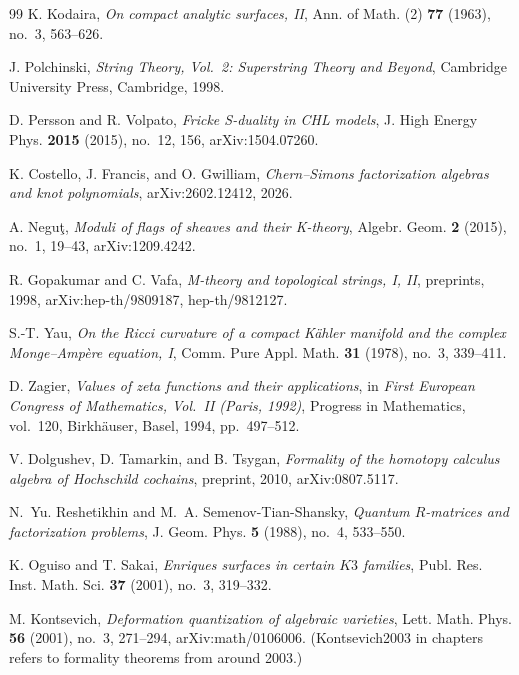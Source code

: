 \begin{thebibliography}{99}
K. Kodaira, \emph{On compact analytic surfaces, II}, Ann. of Math. (2) \textbf{77} (1963), no.~3, 563--626.

J. Polchinski, \emph{String Theory, Vol.\ 2: Superstring Theory and Beyond}, Cambridge University Press, Cambridge, 1998.

D. Persson and R. Volpato, \emph{Fricke S-duality in CHL models}, J. High Energy Phys. \textbf{2015} (2015), no.~12, 156, arXiv:1504.07260.

K. Costello, J. Francis, and O. Gwilliam, \emph{Chern--Simons factorization algebras and knot polynomials}, arXiv:2602.12412, 2026.

A. Negu\c{t}, \emph{Moduli of flags of sheaves and their K-theory}, Algebr. Geom. \textbf{2} (2015), no.~1, 19--43, arXiv:1209.4242.

R. Gopakumar and C. Vafa, \emph{M-theory and topological strings, I, II}, preprints, 1998, arXiv:hep-th/9809187, hep-th/9812127.

S.-T. Yau, \emph{On the Ricci curvature of a compact K\"ahler manifold and the complex Monge--Amp\`ere equation, I}, Comm. Pure Appl. Math. \textbf{31} (1978), no.~3, 339--411.

D. Zagier, \emph{Values of zeta functions and their applications}, in \emph{First European Congress of Mathematics, Vol.\ II (Paris, 1992)}, Progress in Mathematics, vol.~120, Birkh\"auser, Basel, 1994, pp.~497--512.

V. Dolgushev, D. Tamarkin, and B. Tsygan, \emph{Formality of the homotopy calculus algebra of Hochschild cochains}, preprint, 2010, arXiv:0807.5117.

N.~Yu. Reshetikhin and M.~A. Semenov-Tian-Shansky, \emph{Quantum $R$-matrices and factorization problems}, J. Geom. Phys. \textbf{5} (1988), no.~4, 533--550.

K. Oguiso and T. Sakai, \emph{Enriques surfaces in certain $K3$ families}, Publ. Res. Inst. Math. Sci. \textbf{37} (2001), no.~3, 319--332.

M. Kontsevich, \emph{Deformation quantization of algebraic varieties}, Lett. Math. Phys. \textbf{56} (2001), no.~3, 271--294, arXiv:math/0106006. (Kontsevich2003 in chapters refers to formality theorems from around 2003.)


\end{thebibliography}

